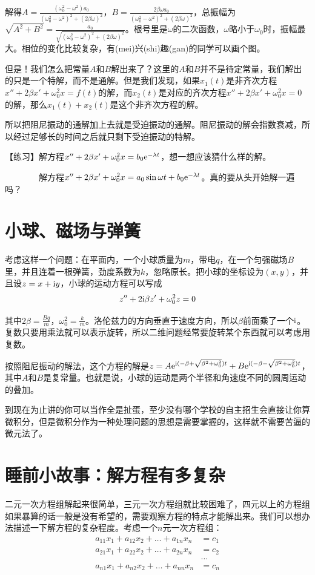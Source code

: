 解得$A=\frac{(\omega_0^2-\omega ^2) a_0}{(\omega_0^2-\omega ^2)^2+(2 \beta \omega)^2}$，$B=\frac{2 \beta \omega a_0}{(\omega_0^2-\omega ^2)^2+(2 \beta \omega)^2}$，总振幅为$\sqrt{A^2+B^2}=\frac{a_0}{\sqrt{(\omega_0^2-\omega ^2)^2+(2 \beta \omega)^2}}$。根号里是$\omega$的二次函数，$\omega$略小于$\omega_0$时，振幅最大。相位的变化比较复杂，有(mei)兴(shi)趣(gan)的同学可以画个图。

但是！我们怎么把常量$A$和$B$解出来了？这里的$A$和$B$并不是待定常量，我们解出的只是一个特解，而不是通解。但是我们发现，如果$x_1(t)$是非齐次方程$x''+2 \beta x'+\omega_0^2 x=f(t)$的解，而$x_2(t)$是对应的齐次方程$x''+2 \beta x'+\omega_0^2 x=0$的解，那么$x_1(t)+x_2(t)$是这个非齐次方程的解。

所以把阻尼振动的通解加上去就是受迫振动的通解。阻尼振动的解会指数衰减，所以经过足够长的时间之后就只剩下受迫振动的特解。

【练习】解方程$x''+2 \beta x'+\omega_0^2 x=b_0 \mathrm{e}^{-\lambda t}$，想一想应该猜什么样的解。

$\phantom{\text{【练习】}}$解方程$x''+2 \beta x'+\omega_0^2 x=a_0 \sin \omega t+b_0 \mathrm{e}^{-\lambda t}$。真的要从头开始解一遍吗？
\section{小球、磁场与弹簧}
考虑这样一个问题：在平面内，一个小球质量为$m$，带电$q$，在一个匀强磁场$B$里，并且连着一根弹簧，劲度系数为$k$，忽略原长。把小球的坐标设为$(x,y)$，并且设$z=x+\mathrm{i} y$，小球的运动方程可以写成
\begin{equation*}
z''+2 \mathrm{i} \beta z'+\omega_0^2 z=0
\end{equation*}

其中$2 \beta=\frac{B q}{m}$，$\omega_0^2=\frac{k}{m}$。洛伦兹力的方向垂直于速度方向，所以$\beta$前面乘了一个$\mathrm{i}$。复数只要用乘法就可以表示旋转，所以二维问题经常要旋转某个东西就可以考虑用复数。

按照阻尼振动的解法，这个方程的解是$z=A \mathrm{e}^{\mathrm{i} (-\beta+\sqrt{\beta^2+\omega_0^2}) t}+B \mathrm{e}^{\mathrm{i} (-\beta-\sqrt{\beta^2+\omega_0^2}) t}$，其中$A$和$B$是复常量。也就是说，小球的运动是两个半径和角速度不同的圆周运动的叠加。

到现在为止讲的你可以当作全是扯蛋，至少没有哪个学校的自主招生会直接让你算微积分，但是微积分作为一种处理问题的思想是需要掌握的，这样就不需要苦逼的微元法了。
\section{睡前小故事：解方程有多复杂}
二元一次方程组解起来很简单，三元一次方程组就比较困难了，四元以上的方程组如果暴算的话一般是没有希望的，需要观察方程的特点才能解出来。我们可以想办法描述一下解方程的复杂程度。考虑一个$n$元一次方程组：
\begin{align*}
a_{1 1} x_1+a_{1 2} x_2+\dots+a_{1 n} x_n&=c_1 \\
a_{2 1} x_1+a_{2 2} x_2+\dots+a_{2 n} x_n&=c_2 \\
&\dots \\
a_{n 1} x_1+a_{n 2} x_2+\dots+a_{n n} x_n&=c_n
\end{align*}

